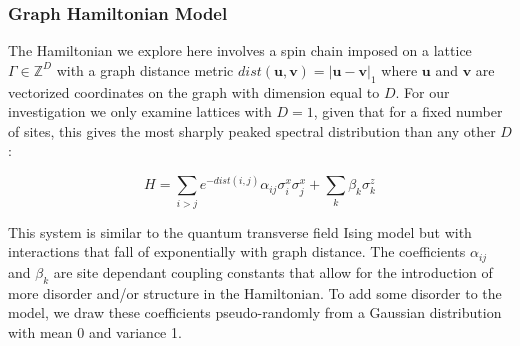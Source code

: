 \subsubsection{Graph Hamiltonian Model}
The Hamiltonian we explore here involves a spin chain imposed on a lattice $\Gamma \in \mathbb{Z}^D$ with a graph distance metric $dist(\mathbf{u},\mathbf{v}) = |\mathbf{u}-\mathbf{v}|_1$ where $\mathbf{u}$ and $\mathbf{v}$ are vectorized coordinates on the graph with dimension equal to $D$. For our investigation we only examine lattices with $D=1$, given that for a fixed number of sites, this gives the most sharply peaked spectral distribution than any other $D$:

\begin{equation}
    H = \sum_{i>j} e^{-dist(i,j)}\alpha_{ij} \sigma^x_i \sigma^x_j + \sum_k \beta_k \sigma_k^z
\end{equation}

This system is similar to the quantum transverse field Ising model but with interactions that fall of exponentially with graph distance. The coefficients $\alpha_{ij}$ and $\beta_k$ are site dependant coupling constants that allow for the introduction of more disorder and/or structure in the Hamiltonian. To add some disorder to the model, we draw these coefficients pseudo-randomly from a Gaussian distribution with mean 0 and variance 1. \\

